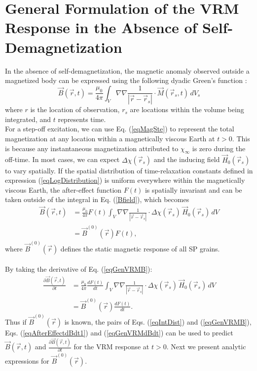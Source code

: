 \documentclass[onecolumn]{IEEEtran} %
\begin{document}
\section{General Formulation of the VRM Response in the Absence of Self-Demagnetization}
\label{secSelfDemag}

In the absence of self-demagnetization,  the magnetic anomaly
observed outside a magnetized body can be expressed using the
following dyadic Green's function \cite{Blakely1996}:
\begin{equation}
\vec B(\vec r,t) = \frac{\mu_0}{4 \pi} \int_{V} \nabla \nabla
\frac{1}{| \vec r - \vec r_s |} \cdot \vec M(\vec r_s, t) \, dV_s
\label{Bfield}
\end{equation}
where $r$ is the location of observation, $r_s$ are locations within the volume being integrated, and $t$ represents time.
\\

For a step-off excitation, we can use Eq.
(\ref{eqMagSte})  to represent the total magnetization at any
location within a magnetically viscous Earth at $t > 0$. This is
because any instantaneous magnetization attributed to $\chi_\infty$
is zero during the off-time. In most cases, we can expect $\Delta
\chi(\vec r_s)$ and the inducing field $\vec H_0(\vec r_s)$ to vary
spatially. If the spatial distribution of time-relaxation constants
defined in expression (\ref{eqLogDistribution}) is uniform
everywhere within the magnetically viscous Earth, the after-effect
function $F(t)$ is spatially invariant and can be taken outside of the
integral in Eq. (\ref{Bfield}), which becomes
\begin{align}
\vec B(\vec r,t) &= \frac{\mu_0}{4 \pi} F(t) \int_V \nabla \nabla \frac{1}{| \vec r - \vec r_s |} \cdot \Delta \chi(\vec r_s) \, \vec H_0(\vec r_s) \, dV \nonumber \\
&= \vec B^{(0)} (\vec r) F(t), \label{eqGenVRMB}
\end{align}
where $\vec B^{(0)}(\vec r)$ defines  the static
magnetic response of all SP grains.
\\\\
By taking the derivative of Eq. (\ref{eqGenVRMB}):
\begin{align}
\frac{\partial \vec B(\vec r,t)}{\partial t} &= \frac{\mu_0}{4 \pi} \frac{d F(t)}{dt} \int_V \nabla \nabla \frac{1}{| \vec r - \vec r_s |} \cdot \Delta \chi(\vec r_s) \, \vec H_0(\vec r_s) \, dV \nonumber \\
&= \vec B^{(0)} (\vec r) \frac{d F(t)}{dt}. \label{eqGenVRMdBdt}
\end{align}
Thus if $\vec B^{(0)}(\vec r)$ is known, the pairs of
Eqs. (\ref{eqIntDist}) and (\ref{eqGenVRMB}), Eqs.
(\ref{eqAfterEffectdBdt1}) and (\ref{eqGenVRMdBdt}) can be used to
predict $\vec B(\vec r,t)$ and $\frac{\partial \vec B(\vec
r,t)}{\partial t}$ for the VRM response at $t
> 0$. Next we present analytic expressions for $\vec B^{(0)} (\vec r)$.
\end{document}
